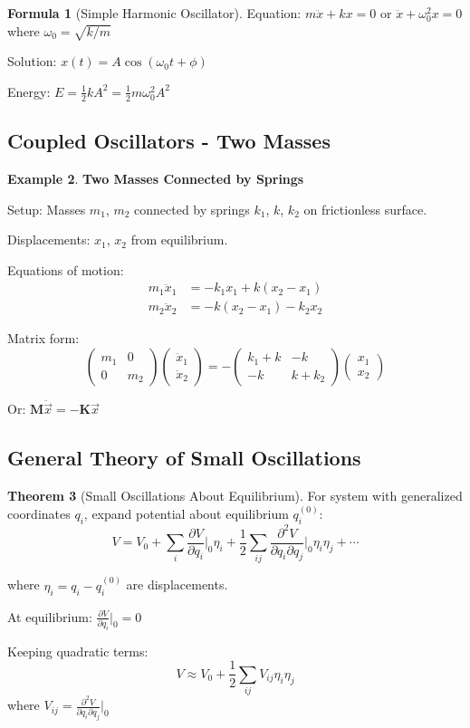 \documentclass[12pt,a4paper]{article}
\theoremstyle{definition}
\newtheorem{theorem}{Theorem}[section]
\newtheorem{example}[theorem]{Example}
\newtheorem{formula}[theorem]{Formula}
\begin{document}
\begin{formula}[Simple Harmonic Oscillator]
Equation: $m\ddot{x} + kx = 0$ or $\ddot{x} + \omega_0^2x = 0$ where $\omega_0 = \sqrt{k/m}$

Solution: $x(t) = A\cos(\omega_0 t + \phi)$

Energy: $E = \frac{1}{2}kA^2 = \frac{1}{2}m\omega_0^2A^2$
\end{formula}

\subsection{Coupled Oscillators - Two Masses}

\begin{example}
\textbf{Two Masses Connected by Springs}

Setup: Masses $m_1$, $m_2$ connected by springs $k_1$, $k$, $k_2$ on frictionless surface.

Displacements: $x_1$, $x_2$ from equilibrium.

Equations of motion:
\begin{align}
m_1\ddot{x}_1 &= -k_1 x_1 + k(x_2 - x_1) \\
m_2\ddot{x}_2 &= -k(x_2 - x_1) - k_2 x_2
\end{align}

Matrix form:
\[
\begin{pmatrix} m_1 & 0 \\ 0 & m_2 \end{pmatrix}
\begin{pmatrix} \ddot{x}_1 \\ \ddot{x}_2 \end{pmatrix}
= -\begin{pmatrix} k_1 + k & -k \\ -k & k + k_2 \end{pmatrix}
\begin{pmatrix} x_1 \\ x_2 \end{pmatrix}
\]

Or: $\mathbf{M}\ddot{\vec{x}} = -\mathbf{K}\vec{x}$
\end{example}

\subsection{General Theory of Small Oscillations}

\begin{theorem}[Small Oscillations About Equilibrium]
For system with generalized coordinates $q_i$, expand potential about equilibrium $q_i^{(0)}$:
\[
V = V_0 + \sum_i \frac{\partial V}{\partial q_i}\bigg|_0 \eta_i + \frac{1}{2}\sum_{ij} \frac{\partial^2 V}{\partial q_i \partial q_j}\bigg|_0 \eta_i\eta_j + \cdots
\]

where $\eta_i = q_i - q_i^{(0)}$ are displacements.

At equilibrium: $\frac{\partial V}{\partial q_i}\bigg|_0 = 0$

Keeping quadratic terms:
\[
V \approx V_0 + \frac{1}{2}\sum_{ij} V_{ij}\eta_i\eta_j
\]
where $V_{ij} = \frac{\partial^2 V}{\partial q_i \partial q_j}\bigg|_0$
\end{theorem}
\end{document}
